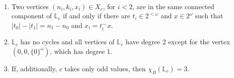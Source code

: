 \documentclass[12pt]{article}
\begin{document}
\begin{lemma}\label{lemma:L0_basics}~ 
    \begin{enumerate}[label=(\alph*)]
        \item Two vertices $(n_i,k_i,x_i)\in X_c$, for $i<2$, are in the same connected component of $\mathbb L_c$ if and only if there are $t_i\in2^{<\omega}$ and $x\in2^\omega$ such that $|t_0|-|t_1|=n_1-n_0$ and $x_i=t_i^\smallfrown x$.
        
        \item $\mathbb L_c$ has no cycles and all vertices of $\mathbb L_c$ have degree 2 except for the vertex $(0,0,\{0\}^\omega)$, which has degree 1.
        
        \item If, additionally, $c$ takes only odd values, then $\chi_B(\mathbb L_c)=3$.
    \end{enumerate}
\end{lemma}
\end{document}
